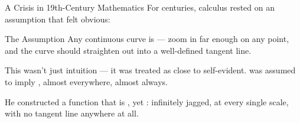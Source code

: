 \begin{frame}{A Crisis in 19th-Century Mathematics}
  \small
  For centuries, calculus rested on an assumption that felt obvious:

  \begin{conceptbox}{The Assumption}
    Any continuous curve is  —
    zoom in far enough on any point, and the curve should straighten
    out into a well-defined tangent line.
  \end{conceptbox}

  \pause
  \vspace{0.3cm}
  This wasn't just intuition — it was treated as close to self-evident.
   was assumed to imply ,
  almost everywhere, almost always.

  \pause
  \vspace{0.3cm}
  \begin{center}
  \end{center}

  \pause
  \vspace{0.2cm}
  He constructed a function that is ,
  yet : infinitely jagged, at every
  single scale, with no tangent line anywhere at all.
\end{frame}

